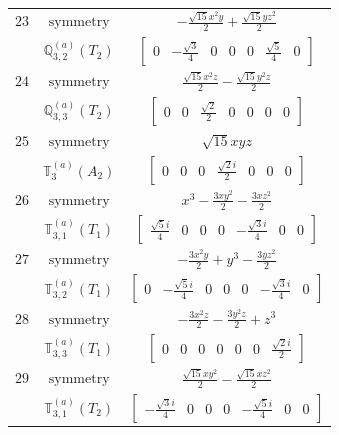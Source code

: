 \documentclass[fleqn,8pt,landscape]{jsarticle}
\begin{document}
\begin{longtable}{ccc}
$ 23 $ & $ \text{symmetry} $ & $ - \frac{\sqrt{15} x^{2} y}{2} + \frac{\sqrt{15} y z^{2}}{2} $ \\
$  $ & $ \mathbb{Q}_{3,2}^{(a)}(T_{2}) $ & $ \begin{bmatrix} 0 & - \frac{\sqrt{3}}{4} & 0 & 0 & 0 & \frac{\sqrt{5}}{4} & 0 \end{bmatrix} $ \\ \hline
$ 24 $ & $ \text{symmetry} $ & $ \frac{\sqrt{15} x^{2} z}{2} - \frac{\sqrt{15} y^{2} z}{2} $ \\
$  $ & $ \mathbb{Q}_{3,3}^{(a)}(T_{2}) $ & $ \begin{bmatrix} 0 & 0 & \frac{\sqrt{2}}{2} & 0 & 0 & 0 & 0 \end{bmatrix} $ \\ \hline
$ 25 $ & $ \text{symmetry} $ & $ \sqrt{15} x y z $ \\
$  $ & $ \mathbb{T}_{3}^{(a)}(A_{2}) $ & $ \begin{bmatrix} 0 & 0 & 0 & \frac{\sqrt{2} i}{2} & 0 & 0 & 0 \end{bmatrix} $ \\ \hline
$ 26 $ & $ \text{symmetry} $ & $ x^{3} - \frac{3 x y^{2}}{2} - \frac{3 x z^{2}}{2} $ \\
$  $ & $ \mathbb{T}_{3,1}^{(a)}(T_{1}) $ & $ \begin{bmatrix} \frac{\sqrt{5} i}{4} & 0 & 0 & 0 & - \frac{\sqrt{3} i}{4} & 0 & 0 \end{bmatrix} $ \\ \hline
$ 27 $ & $ \text{symmetry} $ & $ - \frac{3 x^{2} y}{2} + y^{3} - \frac{3 y z^{2}}{2} $ \\
$  $ & $ \mathbb{T}_{3,2}^{(a)}(T_{1}) $ & $ \begin{bmatrix} 0 & - \frac{\sqrt{5} i}{4} & 0 & 0 & 0 & - \frac{\sqrt{3} i}{4} & 0 \end{bmatrix} $ \\ \hline
$ 28 $ & $ \text{symmetry} $ & $ - \frac{3 x^{2} z}{2} - \frac{3 y^{2} z}{2} + z^{3} $ \\
$  $ & $ \mathbb{T}_{3,3}^{(a)}(T_{1}) $ & $ \begin{bmatrix} 0 & 0 & 0 & 0 & 0 & 0 & \frac{\sqrt{2} i}{2} \end{bmatrix} $ \\ \hline
$ 29 $ & $ \text{symmetry} $ & $ \frac{\sqrt{15} x y^{2}}{2} - \frac{\sqrt{15} x z^{2}}{2} $ \\
$  $ & $ \mathbb{T}_{3,1}^{(a)}(T_{2}) $ & $ \begin{bmatrix} - \frac{\sqrt{3} i}{4} & 0 & 0 & 0 & - \frac{\sqrt{5} i}{4} & 0 & 0 \end{bmatrix} $ \\ \hline

\end{longtable}
\end{document}
